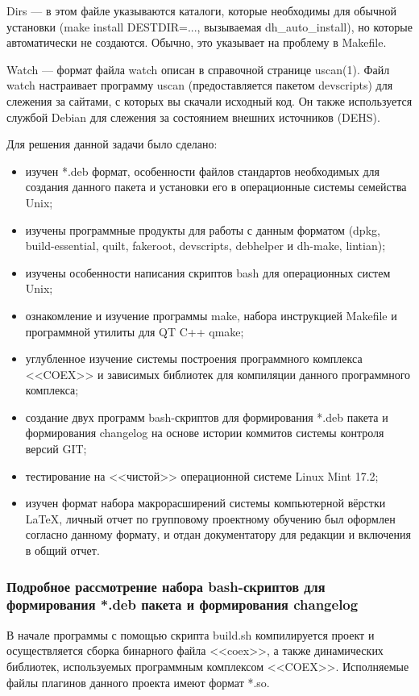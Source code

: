 Dirs --- в этом файле указываются каталоги, которые необходимы для обычной установки (make install DESTDIR=..., вызываемая dh\_auto\_install), но которые автоматически не создаются. Обычно, это указывает на проблему в Makefile.

Watch --- формат файла watch описан в справочной странице uscan(1). Файл watch настраивает программу uscan (предоставляется пакетом devscripts) для слежения за сайтами, с которых вы скачали исходный код. Он также используется службой Debian для слежения за состоянием внешних источников (DEHS).~\cite{deb_package_howto}

Для решения данной  задачи было сделано:

\begin{itemize}
\item изучен *.deb формат, особенности файлов стандартов необходимых для создания данного пакета и установки его в операционные системы семейства Unix; 
\item изучены программные продукты для работы с данным форматом (dpkg, build-essential,  quilt, fakeroot, devscripts, debhelper и dh-make, lintian);
\item изучены особенности написания скриптов bash для операционных систем Unix;
\item ознакомление и изучение программы make, набора инструкцией Makefile и программной утилиты для QT C++ qmake;
\item углубленное изучение системы построения программного комплекса <<COEX>> и зависимых библиотек для компиляции данного программного комплекса;
\item создание двух программ bash-скриптов для формирования *.deb пакета и формирования changelog на основе истории коммитов системы контроля версий GIT;
\item тестирование на <<чистой>> операционной системе Linux Mint 17.2;
\item изучен формат набора макрорасширений системы компьютерной вёрстки LaTeX, личный отчет по групповому проектному обучению был оформлен согласно данному формату, и отдан документатору для редакции и включения в общий отчет.
\end{itemize}

\subsubsection{ Подробное рассмотрение набора bash-скриптов для формирования *.deb пакета и формирования changelog}

В начале программы с помощью скрипта build.sh компилируется проект и осуществляется сборка бинарного файла <<coex>>, а также динамических библиотек, используемых программным комплексом <<COEX>>. Исполняемые файлы плагинов данного проекта имеют формат *.so. 

